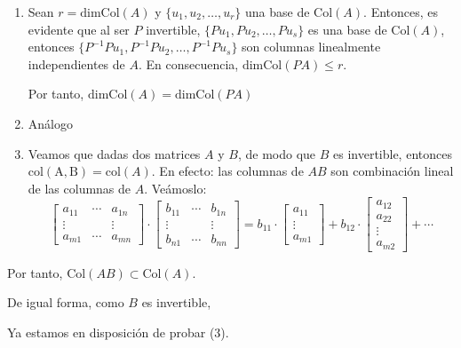 \documentclass[12pt]{article}
\begin{document}
\begin{enumerate}[label=\arabic*), leftmargin=*]
    \item Sean $r=\mathrm{dimCol}(A)$ y $\{u_{1},u_{2},\hdots,u_r\}$ una base de $\mathrm{Col}(A)$. Entonces, es evidente que al ser $P$  invertible, $\{Pu_{1},Pu_{2},\hdots,Pu_s\}$ es una base de $\mathrm{Col}(A)$, entonces $\{P^{-1}Pu_{1},P^{-1}Pu_{2},\hdots,P^{-1}Pu_s\}$ son columnas linealmente independientes de $A$. En consecuencia, $\mathrm{dimCol}(PA)\le r$.
    
    Por tanto, $\mathrm{dimCol}(A)=\mathrm{dimCol}(PA)$
    
    \item Análogo
    
    \item Veamos que dadas dos matrices $A$ y $B$, de modo que $B$ es invertible, entonces $\mathrm{col(A,B)}=\mathrm{col}(A)$. En efecto: las columnas de $AB$ son combinación lineal de las columnas de $A$. Veámoslo: 
    \[\begin{bmatrix}
    a_{11} & \cdots & a_{1n} \\ 
    \vdots &  & \vdots \\ 
    a_{m1} & \cdots & a_{mn}
    \end{bmatrix}\cdot\begin{bmatrix}
    b_{11} & \cdots & b_{1n} \\ 
    \vdots &  & \vdots \\ 
    b_{n1} & \cdots & b_{nn}
    \end{bmatrix}=b_{11}\cdot\begin{bmatrix}
    a_{11}\\
    \vdots\\
    a_{m1}
\end{bmatrix}+b_{12}\cdot\begin{bmatrix}
a_{12}\\
a_{22}\\
\vdots\\
a_{m2}
\end{bmatrix}+\cdots\]
\end{enumerate}
Por tanto, $\mathrm{Col}(AB)\subset\mathrm{Col}(A)$.

De igual forma, como $B$ es invertible, \begin{center}
\end{center}
Ya estamos en disposición de probar (3).
\end{document}
